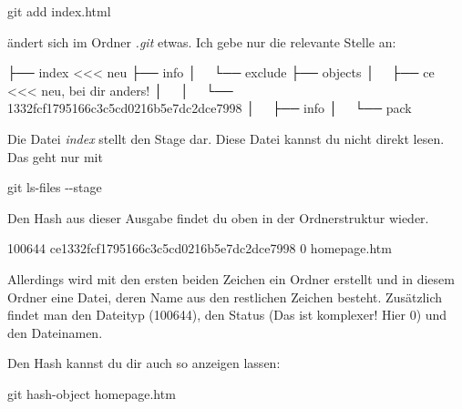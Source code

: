 \documentclass[
  letterpaper,
  DIV=11]{scrreprt}
\newenvironment{Shaded}{\begin{snugshade}}{\end{snugshade}}
\newcommand{\AttributeTok}[1]{\textcolor[rgb]{0.40,0.45,0.13}{#1}}
\newcommand{\ExtensionTok}[1]{\textcolor[rgb]{0.00,0.23,0.31}{#1}}
\newcommand{\FunctionTok}[1]{\textcolor[rgb]{0.28,0.35,0.67}{#1}}
\newcommand{\NormalTok}[1]{\textcolor[rgb]{0.00,0.23,0.31}{#1}}
\newcommand{\OperatorTok}[1]{\textcolor[rgb]{0.37,0.37,0.37}{#1}}
\begin{document}
\begin{Shaded}
\begin{Highlighting}[]
\FunctionTok{git}\NormalTok{ add index.html }
\end{Highlighting}
\end{Shaded}

ändert sich im Ordner \emph{.git} etwas. Ich gebe nur die relevante
Stelle an:

\begin{Shaded}
\begin{Highlighting}[]
\ExtensionTok{├──}\NormalTok{ index            }\OperatorTok{\textless{}\textless{}\textless{}}\NormalTok{ neu }
\ExtensionTok{├──}\NormalTok{ info}
\ExtensionTok{│  }\NormalTok{ └── exclude}
\ExtensionTok{├──}\NormalTok{ objects}
\ExtensionTok{│  }\NormalTok{ ├── ce          }\OperatorTok{\textless{}\textless{}\textless{}}\NormalTok{ neu, bei dir anders! }
\ExtensionTok{│  }\NormalTok{ │   └── 1332fcf1795166c3c5cd0216b5e7dc2dce7998}
\ExtensionTok{│  }\NormalTok{ ├── info}
\ExtensionTok{│  }\NormalTok{ └── pack}
\end{Highlighting}
\end{Shaded}

Die Datei \emph{index} stellt den Stage dar. Diese Datei kannst du nicht
direkt lesen. Das geht nur mit

\begin{Shaded}
\begin{Highlighting}[]
\FunctionTok{git}\NormalTok{ ls{-}files }\AttributeTok{{-}{-}stage} 
\end{Highlighting}
\end{Shaded}

Den Hash aus dieser Ausgabe findet du oben in der Ordnerstruktur wieder.

\begin{Shaded}
\begin{Highlighting}[]
\ExtensionTok{100644}\NormalTok{ ce1332fcf1795166c3c5cd0216b5e7dc2dce7998 0   homepage.htm}
\end{Highlighting}
\end{Shaded}

Allerdings wird mit den ersten beiden Zeichen ein Ordner erstellt und in
diesem Ordner eine Datei, deren Name aus den restlichen Zeichen besteht.
Zusätzlich findet man den Dateityp (100644), den Status (Das ist
komplexer! Hier 0) und den Dateinamen.

Den Hash kannst du dir auch so anzeigen lassen:

\begin{Shaded}
\begin{Highlighting}[]
\FunctionTok{git}\NormalTok{ hash{-}object homepage.htm }
\end{Highlighting}
\end{Shaded}
\end{document}
